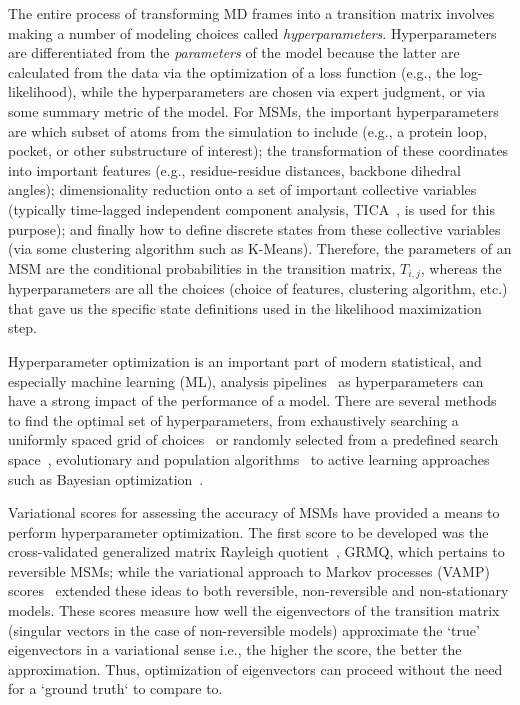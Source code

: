 \documentclass[journal=jacsat,manuscript=article]{achemso}
\begin{document}
The entire process of transforming MD frames into a transition matrix involves making a number of modeling choices called \emph{hyperparameters}. Hyperparameters are differentiated from the \emph{parameters} of the model because the latter are calculated from the data via the optimization of a loss function (e.g., the log-likelihood), while the hyperparameters are chosen via expert judgment, or via some summary metric of the model\cite{feurer2019hyperparameter}. 
For MSMs, the important hyperparameters~\cite{Optimized_2016, scherer_variational_2019, husic_markov_2018} are which subset of atoms from the simulation to include (e.g., a protein loop, pocket, or other substructure of interest); the transformation of these coordinates into important features (e.g., residue-residue distances, backbone dihedral angles); dimensionality reduction onto a set of important collective variables (typically time-lagged independent component analysis, TICA~\cite{perez-hernandezIdentificationSlowMolecular2013a}, is used for this purpose); and finally how to define discrete states from these collective variables (via some clustering algorithm such as K-Means). Therefore, the parameters of an MSM are the conditional probabilities in the transition matrix, $T_{i, j}$, whereas the hyperparameters are all the choices (choice of features, clustering algorithm, etc.) that gave us the specific state definitions used in the likelihood maximization step.   

Hyperparameter optimization is an important part of modern statistical, and especially machine learning (ML), analysis pipelines~\cite{feurer2019hyperparameter, bergstra_jamesbergstra_random_2012, bergstra_making_2013, bergstraAlgorithmsHyperParameterOptimizationa} as hyperparameters can have a strong impact of the performance of a model. There are several methods to find the optimal set of hyperparameters, from exhaustively searching a uniformly spaced grid of choices~\cite{c1997montgomery} or randomly selected from a predefined search space~\cite{bergstra_jamesbergstra_random_2012}, evolutionary and population algorithms~\cite{simon2013evolutionary, kennedyParticleSwarmOptimization1995, eberhart1998comparison, hansenCMAEvolutionStrategy2016} to active learning approaches such as Bayesian optimization~\cite{hutterSequentialModelbasedOptimization2011, bergstraAlgorithmsHyperParameterOptimizationa, NIPS2012_4522, bergstraMakingScienceModel2013}.

Variational scores for assessing the accuracy of MSMs have provided a means to perform hyperparameter optimization. The first score to be developed was the cross-validated generalized matrix Rayleigh quotient~\cite{mcgibbonVariationalCrossvalidationSlow2015}, GRMQ, which pertains to reversible MSMs; while the variational approach to Markov processes (VAMP) scores~\cite{wuVariationalApproachLearning2020c,scherer_variational_2019} extended these ideas to both reversible, non-reversible and non-stationary models. These scores measure how well the eigenvectors of the transition matrix (singular vectors in the case of non-reversible models) approximate the `true' eigenvectors in a variational sense i.e., the higher the score, the better the approximation. Thus, optimization of eigenvectors can proceed without the need for a `ground truth` to compare to.   
\end{document}
